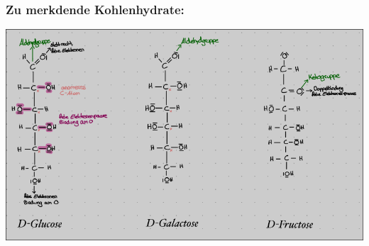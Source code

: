\subsubsection{Zu merkdende Kohlenhydrate:}
\includegraphics[scale=0.55]{media/naturstoffe/test.png}
